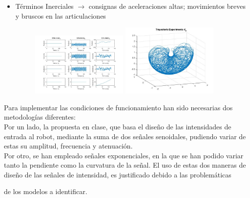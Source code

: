 \begin{itemize}
	\item Términos Inerciales $ \rightarrow $ consignas de aceleraciones altas; movimientos breves y bruscos en las articulaciones
	
	\begin{figure}[h!]
		\centering
		\includegraphics[width=0.45\textwidth]{graftheta8}
		\includegraphics[width=0.45\textwidth]{Traytheta8}
	\end{figure}
	
\end{itemize}



Para implementar las condiciones de funcionamiento han sido necesarias dos metodologías diferentes:\\




Por un lado, la propuesta en clase, que basa el diseño de las intensidades de entrada al robot, mediante la suma de dos señales senoidales, pudiendo variar de estas su amplitud, frecuencia y atenuación.\\

Por otro, se han empleado señales exponenciales, en la que se han podido variar tanto la pendiente como la curvatura de la señal.	El uso de estas dos maneras de diseño de las señales de intensidad, es justificado debido a las problemáticas

de los modelos a identificar.\\



